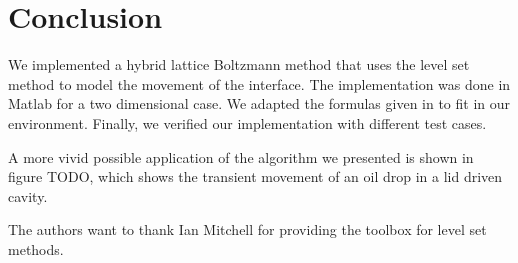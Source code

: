 \documentclass[final,leqno,onefignum,onetabnum]{siamltexmm}
\begin{document}
\section{Conclusion}
We implemented a hybrid lattice Boltzmann method that uses the level set method to model the movement of the interface. The implementation was done in Matlab for a two dimensional case. We adapted the formulas given in \cite{Thoemmes} to fit in our environment. Finally, we verified our implementation with different test cases.

A more vivid possible application of the algorithm we presented is shown in figure TODO, which shows the transient movement of an oil drop in a lid driven cavity. %

The authors want to thank Ian Mitchell for providing the toolbox for level set methods.

\end{document}
